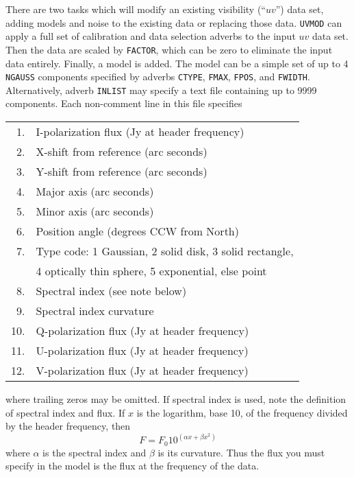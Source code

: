 \documentclass[twoside]{article}
\newcommand{\Me}[1]{\textcolor{mecol}{#1}}
\begin{document}
There are two tasks which will modify an existing visibility (``$uv$'')
data set, adding models and noise to the existing data or replacing
those data.  {\tt UVMOD} can apply a full set of calibration and data
selection adverbs to the input $uv$ data set.  Then the data are
scaled by {\tt FACTOR}, which can be zero to eliminate the input data
entirely.  Finally, a model is added.  The model can be a simple set
of up to 4 {\tt NGAUSS} components specified by adverbs {\tt CTYPE},
{\tt FMAX}, {\tt FPOS}, and {\tt FWIDTH}\@.  Alternatively, adverb
{\tt INLIST} may specify a text file containing up to 9999 components.
Each non-comment line in this file specifies
\begin{center}
\begin{tabular}{|r|l|}\hline
 1. & I-polarization flux (Jy at \Me{header frequency})\\
 2. & X-shift from reference (arc seconds)\\
 3. & Y-shift from reference (arc seconds)\\
 4. & Major axis (arc seconds)\\
 5. & Minor axis (arc seconds)\\
 6. & Position angle (degrees CCW from North)\\
 7. & Type code: 1 Gaussian, 2 solid disk, 3 solid rectangle,\\
    & 4 optically thin sphere, 5 exponential, else point\\
 8. & Spectral index (see note below)\\
 9. & Spectral index curvature\\
10. & Q-polarization flux (Jy at \Me{header frequency})\\
11. & U-polarization flux (Jy at \Me{header frequency})\\
12. & V-polarization flux (Jy at \Me{header frequency}) \\ \hline
\end{tabular}
\end{center}
where trailing zeros may be omitted.  If spectral index is used, note
the definition of spectral index and flux.  If $x$ is the logarithm,
base 10, of the frequency \Me{divided by the header frequency}, then
$$ F = F_0 10^{(\alpha x + \beta x^2)} $$
where $\alpha$ is the spectral index and $\beta$ is its curvature.
Thus the flux you must specify in the model is \Me{the flux at the
frequency of the data}.
\end{document}
